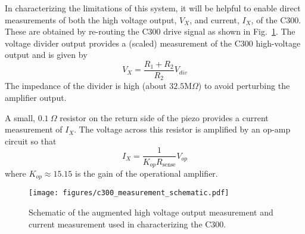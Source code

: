 \documentclass[journal,twocolumn,twoside]{IEEEtran}
\begin{document}
In characterizing the limitations of this system, it will be helpful to enable direct measurements of both the high voltage output, $V_X$, and current, $I_X$, of the C300. These are obtained by re-routing the C300 drive signal as shown in Fig.~\ref{fig:c300_meas}. The voltage divider output provides a (scaled) measurement of the C300 high-voltage output and is given by
\begin{equation}
V_X = \frac{R_1 + R_2}{R_2}V_{div}
\end{equation}
The impedance of the divider is high (about $32.5\text{M}\Omega$) to avoid perturbing the amplifier output.

A small, $0.1~\Omega$ resistor on the return side of the piezo provides a current measurement of $I_X$. The voltage across this resistor is amplified by an op-amp circuit so that
\begin{equation}
I_{X} = \frac{1}{K_{op}R_{\text{sense}}}V_{op}
\end{equation}
where $K_{op}\approx 15.15$ is the gain of the operational amplifier.
\begin{figure}
    \texttt{[image: figures/c300\_measurement\_schematic.pdf]}
    \caption{Schematic of the augmented high voltage output measurement and current measurement used in characterizing the C300.}
    \label{fig:c300_meas}
\end{figure}
\end{document}
